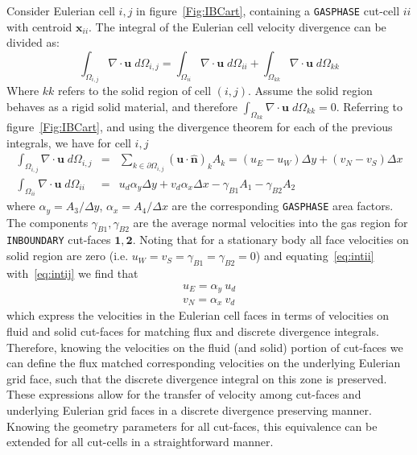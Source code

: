 Consider Eulerian cell $i,j$ in figure~\ref{Fig:IBCart}, containing a \texttt{GASPHASE} cut-cell $ii$ with centroid $\mathbf{x}_{ii}$. The integral of the Eulerian cell velocity divergence can be divided as:
%
\begin{equation}
   \int_{\Omega_{i,j}}{ \nabla \cdot \mathbf{u}} \; d\Omega_{i,j} = \int_{\Omega_{ii}}{ \nabla \cdot \mathbf{u}} \; d\Omega_{ii} +
                                                                                                     \int_{\Omega_{kk}}{ \nabla \cdot \mathbf{u}} \; d\Omega_{kk}
\end{equation}
%
Where $kk$ refers to the solid region of cell $(i,j)$. Assume the solid region behaves as a rigid solid material, and therefore $\int_{\Omega_{kk}}{ \nabla \cdot \mathbf{u}} \; d\Omega_{kk} = 0$.
Referring to figure~\ref{Fig:IBCart}, and using the divergence theorem for each of the previous integrals, we have for cell $i,j$
%
\begin{eqnarray}
  \int_{\Omega_{i,j}}{ \nabla \cdot \mathbf{u}} \; d\Omega_{i,j} &=& \sum_{k \in \partial \Omega_{i,j}}{(\mathbf{u} \cdot \mathbf{\hat{n}})_k A_k} = (u_E-u_W) \Delta y + (v_N-v_S) \Delta x \label{eq:intij}\\
  \int_{\Omega_{ii}}{ \nabla \cdot \mathbf{u}} \; d\Omega_{ii}  &=& u_d \alpha_y \Delta y + v_d \alpha_x \Delta x -
  \gamma_{B1} A_1 - \gamma_{B2} A_2   \label{eq:intii}
\end{eqnarray}
%
where $\alpha_y=A_3/\Delta y$, $\alpha_x=A_4/\Delta x$ are the corresponding  \texttt{GASPHASE} area factors. The components $ \gamma_{B1}, \gamma_{B2}$ are the average normal velocities into the gas region for  \texttt{INBOUNDARY} cut-faces $\mathbf{1},\mathbf{2}$. Noting that for a stationary body all face velocities on solid region are zero (i.e. $u_W=v_S=\gamma_{B1}=\gamma_{B2}=0$) and equating~\eqref{eq:intii} with~\eqref{eq:intij} we find that
%
\begin{eqnarray}
  u_E = \alpha_y \: u_d  \label{eq:uE} \\
  v_N  = \alpha_x \: v_d  \label{eq:vN}
\end{eqnarray}
%
which express the velocities in the Eulerian cell faces in terms of velocities on fluid and solid cut-faces for matching flux and discrete divergence integrals. Therefore, knowing the velocities on the fluid (and solid) portion of cut-faces we can define the flux matched corresponding velocities on the underlying Eulerian grid face, such that the discrete divergence integral on this zone is preserved.
These expressions allow for the transfer of velocity among cut-faces and underlying Eulerian grid faces in a discrete divergence preserving manner.
Knowing the geometry parameters for all cut-faces, this equivalence can be extended for all cut-cells in a straightforward manner.

